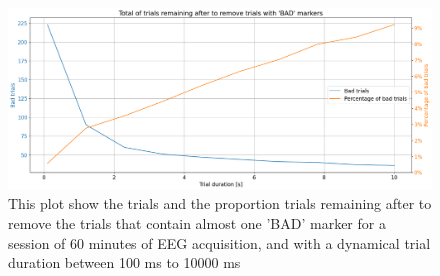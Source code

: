 
\begin{figure}
\begin{centering}
% 
\includegraphics[width=1\textwidth]{Cap3/Figures/trials_remaning.png}
\par\end{centering}
\caption[Trials remaining after to remove trials with 'BAD' markers]{This plot show the trials and the proportion trials remaining after to remove the trials that contain almost one 'BAD' marker for a session of 60 minutes of EEG acquisition, and with a dynamical trial duration between 100 ms to 10000 ms}
\label{fig:trials_remaning}
\end{figure}